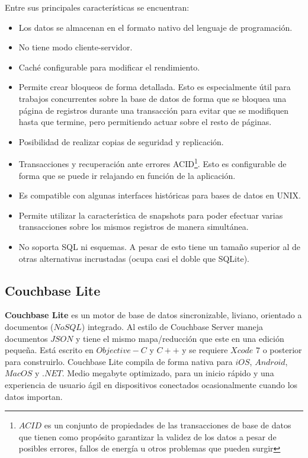 Entre sus principales características se encuentran: 
\begin{itemize}


\item	Los datos se almacenan en el formato nativo del lenguaje de programación.
\item	No tiene modo cliente-servidor.
\item	Caché configurable para modificar el rendimiento.
\item	Permite crear bloqueos de forma detallada. Esto es especialmente útil para trabajos concurrentes sobre la base de datos de forma que se bloquea una página de registros durante una transacción para evitar que se modifiquen hasta que termine, pero permitiendo actuar sobre el resto de páginas.
\item	Posibilidad de realizar copias de seguridad y replicación.
\item	Transacciones y recuperación ante errores ACID\footnote{$ACID$ es un conjunto de propiedades de las transacciones de base de datos que tienen como propósito garantizar la validez de los datos a pesar de posibles errores, fallos de energía u otros problemas que pueden surgir}. Esto es configurable de forma que se puede ir relajando en función de la aplicación.
\item	Es compatible con algunas interfaces históricas para bases de datos en UNIX.
\item	Permite utilizar la característica de snapshots para poder efectuar varias transacciones sobre los mismos registros de manera simultánea.
\item	No soporta SQL ni esquemas. A pesar de esto tiene un tamaño superior al de otras alternativas incrustadas (ocupa casi el doble que SQLite).
\end{itemize}


\subsection{Couchbase Lite}\label{chapter:introduction}


\textbf{Couchbase Lite} es un motor de base de datos sincronizable, liviano, orientado a documentos ($NoSQL$) integrado. Al estilo de Couchbase Server maneja documentos $JSON$ y tiene el mismo mapa/reducción que este en una edición pequeña. Está escrito en $Objective-C$ y $C++$ y se requiere $Xcode$ $7$ o posterior para construirlo. Couchbase Lite compila de forma nativa para $iOS$, $Android$, $Mac OS$ y $.NET$. Medio megabyte optimizado, para un inicio rápido y una experiencia de usuario ágil en dispositivos conectados ocasionalmente cuando los datos importan.

